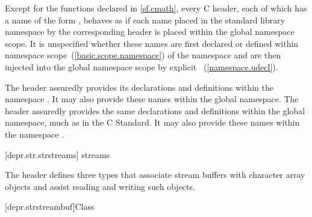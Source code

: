\pnum
Except for the functions declared in \ref{sf.cmath}, every C header, each of
which has a name of the form
%
,
behaves as if each name placed in the standard library namespace by
the corresponding
header is placed within
the global namespace scope. It is unspecified whether these names are first declared or defined within
namespace scope~(\ref{basic.scope.namespace}) of the namespace
 and are then injected into the global namespace scope by
explicit ~(\ref{namespace.udecl}).
%

\pnum
\enterexample
The header
%
%
 assuredly
provides its declarations and definitions within the namespace
. It may also provide these names within the
global namespace.
The header
assuredly provides the same declarations and definitions within
the global namespace,
much as in the C Standard. It may also provide these names within
the namespace .
\exitexample

[depr.str.strstreams]{ streams}

\pnum
The header
defines three types that associate stream buffers with
character array objects and assist reading and writing such objects.

[depr.strstreambuf]{Class }

